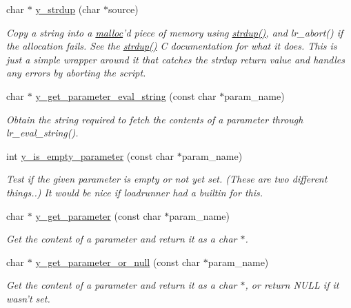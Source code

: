 \begin{DoxyCompactItemize}
char $\ast$ \hyperlink{group__core_ga8cba325c05b63bbbdc499702c4f5c6e9}{y\-\_\-strdup} (char $\ast$source)
\begin{DoxyCompactList}\small\item\em Copy a string into a \hyperlink{group__memory_ga5f1a5df9b8c50bd259b8c34c0056e304}{malloc}'d piece of memory using \hyperlink{group__string_ga86e0df1bf9e434074f958434e0af7581}{strdup()}, and lr\-\_\-abort() if the allocation fails. See the \hyperlink{group__string_ga86e0df1bf9e434074f958434e0af7581}{strdup()} C documentation for what it does. This is just a simple wrapper around it that catches the strdup return value and handles any errors by aborting the script. \end{DoxyCompactList}\item 
char $\ast$ \hyperlink{group__core_gab903d513f84dc0cd3f7af7acf67e2fb2}{y\-\_\-get\-\_\-parameter\-\_\-eval\-\_\-string} (const char $\ast$param\-\_\-name)
\begin{DoxyCompactList}\small\item\em Obtain the string required to fetch the contents of a parameter through lr\-\_\-eval\-\_\-string(). \end{DoxyCompactList}\item 
int \hyperlink{group__core_gac0778c8b8f3da732862ab82176857be8}{y\-\_\-is\-\_\-empty\-\_\-parameter} (const char $\ast$param\-\_\-name)
\begin{DoxyCompactList}\small\item\em Test if the given parameter is empty or not yet set. (These are two different things..) It would be nice if loadrunner had a builtin for this. \end{DoxyCompactList}\item 
char $\ast$ \hyperlink{group__core_ga8252a459f15c52a8680fff9ddbd7356c}{y\-\_\-get\-\_\-parameter} (const char $\ast$param\-\_\-name)
\begin{DoxyCompactList}\small\item\em Get the content of a parameter and return it as a char $\ast$. \end{DoxyCompactList}\item 
char $\ast$ \hyperlink{group__core_gaf81efb56d5afc4806cdc79f64ba3d675}{y\-\_\-get\-\_\-parameter\-\_\-or\-\_\-null} (const char $\ast$param\-\_\-name)
\begin{DoxyCompactList}\small\item\em Get the content of a parameter and return it as a char $\ast$, or return N\-U\-L\-L if it wasn't set. \end{DoxyCompactList}\item 

\end{DoxyCompactItemize}
